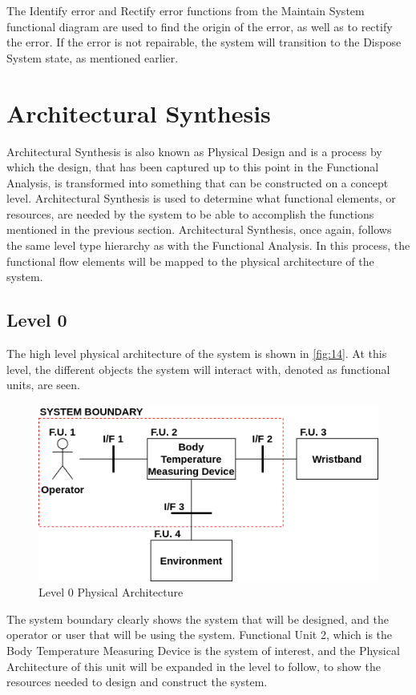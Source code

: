 \noindent
The Identify error and Rectify error functions from the Maintain System functional diagram are used to find the origin of the error, as well as to rectify the error. If the error is not repairable, the system will transition to the Dispose System state, as mentioned earlier. 

\section{Architectural Synthesis}
Architectural Synthesis is also known as Physical Design and is a process by which the design, that has been captured up to this point in the Functional Analysis, is transformed into something that can be constructed on a concept level. Architectural Synthesis is used to determine what functional elements, or resources, are needed by the system to be able to accomplish the functions mentioned in the previous section. Architectural Synthesis, once again, follows the same level type hierarchy as with the Functional Analysis. In this process, the functional flow elements will be mapped to the physical architecture of the system. 

\subsection{Level 0}
The high level physical architecture of the system is shown in \autoref{fig:14}. At this level, the different objects the system will interact with, denoted as functional units, are seen. 
\begin{figure}[H]
	\centering
	\includegraphics[scale=0.5]{img/L0PA}
	\caption{Level 0 Physical Architecture}
	\label{fig:14}
\end{figure}
\noindent
The system boundary clearly shows the system that will be designed, and the operator or user that will be using the system. Functional Unit 2, which is the Body Temperature Measuring Device is the system of interest, and the Physical Architecture of this unit will be expanded in the level to follow, to show the resources needed to design and construct the system. 

